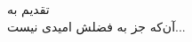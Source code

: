\begin{acknowledgementpage}

\vspace{1.5cm}

{\nastaliq
{
تقدیم به \\
آن‌که جز به فضلش امیدی نیست...\\
}}\end{acknowledgementpage}
\newpage